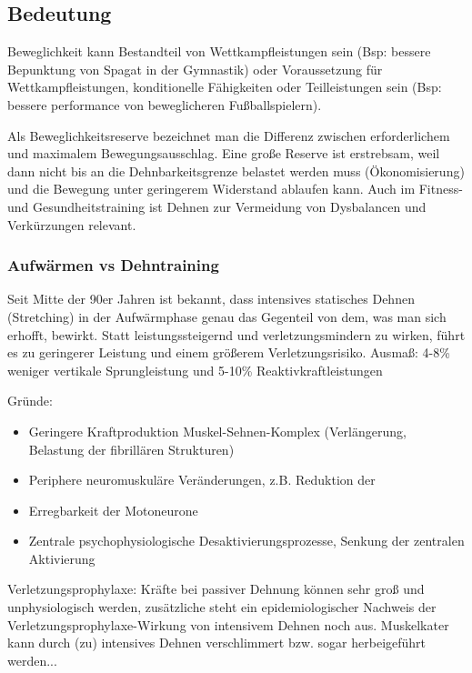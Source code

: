 \subsection{Bedeutung}

Beweglichkeit kann Bestandteil von Wettkampfleistungen sein (Bsp: bessere Bepunktung von Spagat in der Gymnastik) oder Voraussetzung für Wettkampfleistungen, konditionelle Fähigkeiten oder Teilleistungen sein (Bsp: bessere performance von beweglicheren Fußballspielern).

Als Beweglichkeitsreserve bezeichnet man die Differenz zwischen erforderlichem und maximalem Bewegungsausschlag. Eine große Reserve ist erstrebsam, weil dann nicht bis an die Dehnbarkeitsgrenze belastet werden muss (Ökonomisierung) und die Bewegung unter geringerem Widerstand ablaufen kann. Auch im Fitness- und Gesundheitstraining ist Dehnen zur Vermeidung von Dysbalancen und Verkürzungen relevant.

\subsubsection*{Aufwärmen vs Dehntraining}

Seit Mitte der 90er Jahren ist bekannt, dass intensives statisches Dehnen (Stretching) in der Aufwärmphase genau das Gegenteil von dem, was man sich erhofft, bewirkt.
Statt leistungssteigernd und verletzungsmindern zu wirken, führt es zu geringerer Leistung und einem größerem Verletzungsrisiko. Ausmaß: 4-8\% weniger vertikale Sprungleistung und 5-10\% Reaktivkraftleistungen

Gründe:
\begin{itemize}
    \item Geringere Kraftproduktion Muskel-Sehnen-Komplex (Verlängerung, Belastung der fibrillären Strukturen)
    \item Periphere neuromuskuläre Veränderungen, z.B. Reduktion der
    \item Erregbarkeit der Motoneurone
    \item Zentrale psychophysiologische Desaktivierungsprozesse, Senkung der zentralen Aktivierung
\end{itemize}

Verletzungsprophylaxe: Kräfte bei passiver Dehnung können sehr groß und unphysiologisch werden, zusätzliche steht ein epidemiologischer Nachweis der Verletzungsprophylaxe-Wirkung von intensivem Dehnen noch aus. Muskelkater kann durch (zu) intensives Dehnen verschlimmert bzw. sogar herbeigeführt werden...

